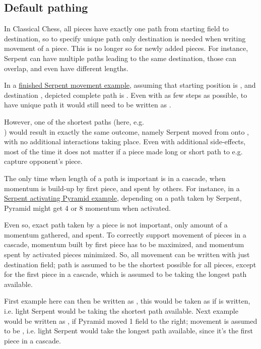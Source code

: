 \subsection*{Default pathing}
\label{sec:Appendix/Notation/Default pathing}

In Classical Chess, all pieces have exactly one path from starting field to destination,
so to specify unique path only destination is needed when writing movement of a piece.
This is no longer so for newly added pieces. For instance, Serpent can have multiple paths
leading to the same destination, those can overlap, and even have different lengths.

In a \hyperref[fig:scn_tr_05_serpent_end]{finished Serpent movement example}, assuming that
starting position is , and destination , depicted complete path is
. Even with as few steps as possible, to have unique path
it would still need to be written as .

However, one of the shortest paths (here, e.g. \\
) would result in exactly the same outcome, namely Serpent moved from
 onto , with no additional interactions taking place. Even with additional
side-effects, most of the time it does not matter if a piece made long or short path to e.g.
capture opponent's piece.

The only time when length of a path is important is in a cascade, when momentum is build-up
by first piece, and spent by others. For instance, in a
\hyperref[fig:scn_tr_06_serpent_loop_1]{Serpent activating Pyramid example}, depending on
a path taken by Serpent, Pyramid might get 4 or 8 momentum when activated.

Even so, exact path taken by a piece is not important, only amount of a momentum gathered,
and spent. To correctly support movement of pieces in a cascade, momentum built by first
piece has to be maximized, and momentum spent by activated pieces minimized. So, all movement
can be written with just destination field; path is assumed to be the shortest possible for
all pieces, except for the first piece in a cascade, which is assumed to be taking the longest
path available.

First example here can then be written as , this would be taken as if
 is written, i.e. light Serpent would be taking the shortest path
available. Next example would be written as , if Pyramid moved 1 field
to the right; movement is assumed to be ,
i.e. light Serpent would take the longest path available, since it's the first piece in
a cascade.

